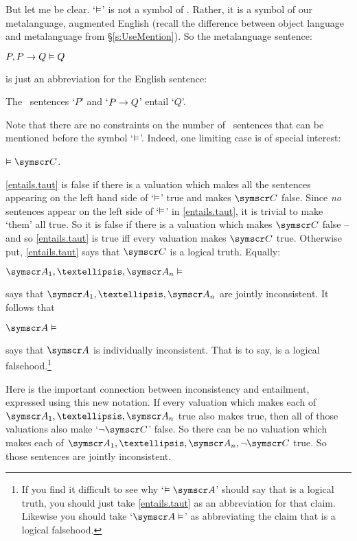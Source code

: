 But let me be clear. `$\vDash$' is not a symbol of \TFL. Rather, it is a symbol of our metalanguage, augmented English (recall the difference between object language and metalanguage from §\ref{s:UseMention}). So the metalanguage sentence:
	\begin{earg}
		\item[\ex{turnstile}] $P, P \rightarrow Q \vDash Q$
	\end{earg}
is just an abbreviation for the English sentence: 
	\begin{earg}
		\item[\ex{turnstile.trans}] The \TFL\ sentences `$P$' and `$P \rightarrow Q$' entail `$Q$'.
	\end{earg}
Note that there are no constraints on the number of \TFL\ sentences that can be mentioned before the symbol `$\vDash$'. Indeed, one limiting case is of special interest:
	\begin{earg}
	\item[\ex{entails.taut}] $\entails \meta{C}$.\end{earg}
\ref{entails.taut}  is false if there is a valuation which makes all the sentences appearing on the left hand side of `$\vDash$' true and makes $\meta{C}$ false. Since \emph{no} sentences appear on the left side of `$\vDash$' in \ref{entails.taut}, it is trivial to make `them' all true. So it is false if there is a valuation which makes $\meta{C}$ false – and so \ref{entails.taut} is true iff every valuation makes $\meta{C}$ true. Otherwise put, \ref{entails.taut} says that $\meta{C}$ is a logical truth. Equally:
	\begin{earg}
		\item[\ex{incon.entails}] $\meta{A}_{1},…,\meta{A}_{n} \entails$
	\end{earg}
says that $\meta{A}_{1},…,\meta{A}_{n}$ are jointly inconsistent. It follows that
	\begin{earg}
		\item[\ex{cont.entails}] $\meta{A} \entails$
	\end{earg}
says that $\meta{A}$ is individually inconsistent. That is to say,  is a logical falsehood.\footnote{If you find it difficult to see why `$\entails\meta{A}$' should say that  is a logical truth, you should just take \ref{entails.taut} as an abbreviation for that claim. Likewise you should take  `$\meta{A}\entails$' as abbreviating the claim that  is a logical falsehood.}

Here is the important connection between inconsistency and entailment, expressed using this new notation.  If every valuation which makes each of $\meta{A}_{1},…,\meta{A}_{n}$ true also makes  true, then all of those valuations also make `$\enot\meta{C}$' false. So there can be no valuation which makes each of $\meta{A}_{1}, …, \meta{A}_{n}, \enot\meta{C}$ true. So those sentences are jointly inconsistent.

